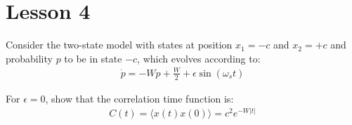 \documentclass[../template.tex]{subfiles}
\begin{document}
\chapter{Lesson 4}
Consider the two-state model with states at position $x_1 = -c$ and $x_2 = +c$ and probability $p$ to be in state $-c$, which evolves according to:
\begin{align*}
    \dot{p} = -W p + \frac{W}{2} + \epsilon \sin(\omega_s t) 
\end{align*}

\begin{exo}
    For $\epsilon=0$, show that the correlation time function is:
    \begin{align*}
        C(t) = \langle x(t) x(0) \rangle = c^2 e^{-W|t|}    
    \end{align*}

    \medskip


\end{exo}
\end{document}
